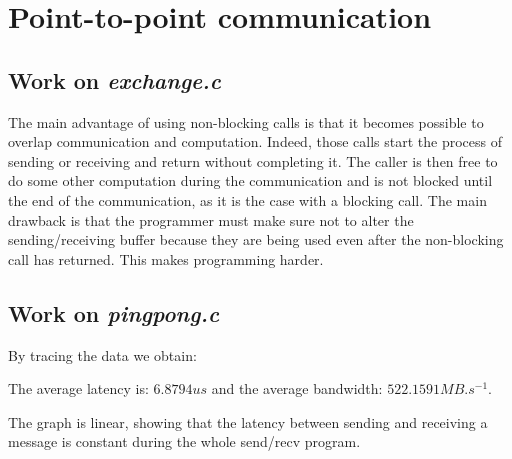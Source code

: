 \chapter{Point-to-point communication}

\section{Work on \textit{exchange.c}}

The main advantage of using non-blocking calls is that it becomes possible to overlap communication and computation. Indeed, those calls start the process of sending or receiving and return without completing it. The caller is then free to do some other computation during the communication and is not blocked until the end of the communication, as it is the case with a blocking call. The main drawback is that the programmer must make sure not to alter the sending/receiving buffer because they are being used even after the non-blocking call has returned. This makes programming harder.

\section{Work on \textit{pingpong.c}}

By tracing the data we obtain:

  \begin{center}
  \end{center}

The average latency is: $6.8794us$ and the average bandwidth: $522.1591 MB.s^{-1}$.

The graph is linear, showing that the latency between sending and receiving a message is constant during the whole send/recv program.

